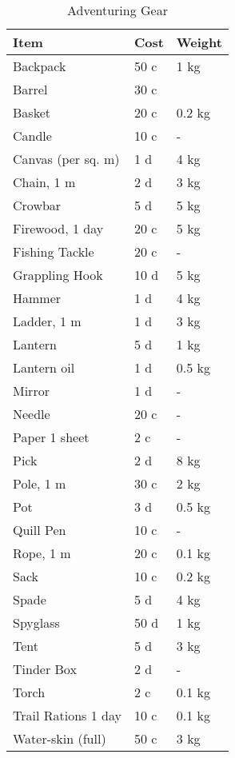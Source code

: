 \documentclass[a4paper,11pt,oneside]{book}
\begin{document}
\begin{table}[ht]
	\centering
	\caption{Adventuring Gear}
	\begin{tabular}{|l|l|l|}
		\hline
		Item & Cost & Weight\\ [0.5ex]
		\hline
		Backpack & 50 c & 1 kg\\
		Barrel & 30 c & \\
		Basket & 20 c & 0.2 kg\\
		Candle & 10 c & -\\
		Canvas (per sq. m) & 1 d & 4 kg\\
		Chain, 1 m & 2 d & 3 kg\\
		Crowbar & 5 d & 5 kg\\
		Firewood, 1 day & 20 c & 5 kg\\
		Fishing Tackle & 20 c & -\\
		Grappling Hook & 10 d & 5 kg\\
		Hammer & 1 d & 4 kg\\
		Ladder, 1 m & 1 d & 3 kg\\
		Lantern & 5 d & 1 kg\\
		Lantern oil & 1 d & 0.5 kg \\
		Mirror & 1 d & -\\
		Needle & 20 c & -\\
		Paper 1 sheet & 2 c & -\\
		Pick & 2 d & 8 kg\\
		Pole, 1 m & 30 c & 2 kg\\
		Pot & 3 d & 0.5 kg\\
		Quill Pen & 10 c & -\\
		Rope, 1 m & 20 c & 0.1 kg\\
		Sack & 10 c & 0.2 kg\\
		Spade & 5 d & 4 kg\\
		Spyglass & 50 d & 1 kg\\
		Tent & 5 d & 3 kg\\
		Tinder Box & 2 d & -\\
		Torch & 2 c & 0.1 kg\\
		Trail Rations 1 day & 10 c & 0.1 kg\\
		Water-skin (full) & 50 c & 3 kg\\		
		\hline
	\end{tabular}
\end{table}
\end{document}
